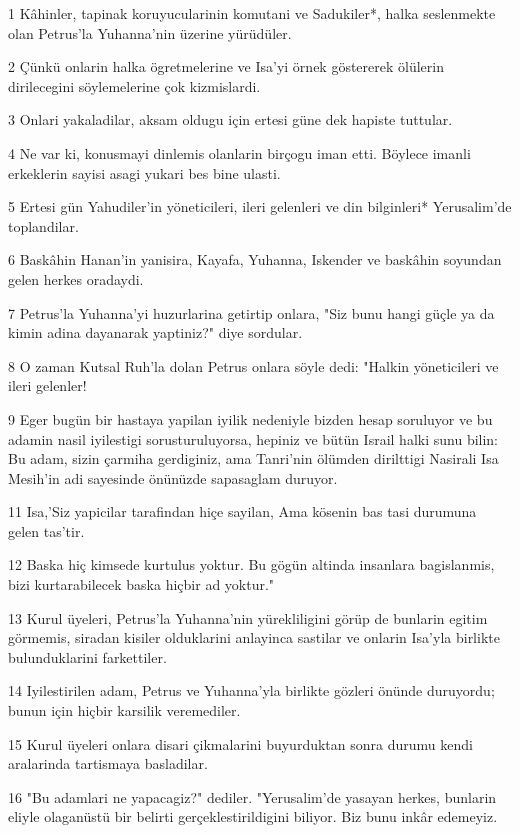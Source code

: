 \par 1 Kâhinler, tapinak koruyucularinin komutani ve Sadukiler*, halka seslenmekte olan Petrus'la Yuhanna'nin üzerine yürüdüler.
\par 2 Çünkü onlarin halka ögretmelerine ve Isa'yi örnek göstererek ölülerin dirilecegini söylemelerine çok kizmislardi.
\par 3 Onlari yakaladilar, aksam oldugu için ertesi güne dek hapiste tuttular.
\par 4 Ne var ki, konusmayi dinlemis olanlarin birçogu iman etti. Böylece imanli erkeklerin sayisi asagi yukari bes bine ulasti.
\par 5 Ertesi gün Yahudiler'in yöneticileri, ileri gelenleri ve din bilginleri* Yerusalim'de toplandilar.
\par 6 Baskâhin Hanan'in yanisira, Kayafa, Yuhanna, Iskender ve baskâhin soyundan gelen herkes oradaydi.
\par 7 Petrus'la Yuhanna'yi huzurlarina getirtip onlara, "Siz bunu hangi güçle ya da kimin adina dayanarak yaptiniz?" diye sordular.
\par 8 O zaman Kutsal Ruh'la dolan Petrus onlara söyle dedi: "Halkin yöneticileri ve ileri gelenler!
\par 9 Eger bugün bir hastaya yapilan iyilik nedeniyle bizden hesap soruluyor ve bu adamin nasil iyilestigi sorusturuluyorsa, hepiniz ve bütün Israil halki sunu bilin: Bu adam, sizin çarmiha gerdiginiz, ama Tanri'nin ölümden dirilttigi Nasirali Isa Mesih'in adi sayesinde önünüzde sapasaglam duruyor.
\par 11 Isa,'Siz yapicilar tarafindan hiçe sayilan, Ama kösenin bas tasi durumuna gelen tas'tir.
\par 12 Baska hiç kimsede kurtulus yoktur. Bu gögün altinda insanlara bagislanmis, bizi kurtarabilecek baska hiçbir ad yoktur."
\par 13 Kurul üyeleri, Petrus'la Yuhanna'nin yürekliligini görüp de bunlarin egitim görmemis, siradan kisiler olduklarini anlayinca sastilar ve onlarin Isa'yla birlikte bulunduklarini farkettiler.
\par 14 Iyilestirilen adam, Petrus ve Yuhanna'yla birlikte gözleri önünde duruyordu; bunun için hiçbir karsilik veremediler.
\par 15 Kurul üyeleri onlara disari çikmalarini buyurduktan sonra durumu kendi aralarinda tartismaya basladilar.
\par 16 "Bu adamlari ne yapacagiz?" dediler. "Yerusalim'de yasayan herkes, bunlarin eliyle olaganüstü bir belirti gerçeklestirildigini biliyor. Biz bunu inkâr edemeyiz.
